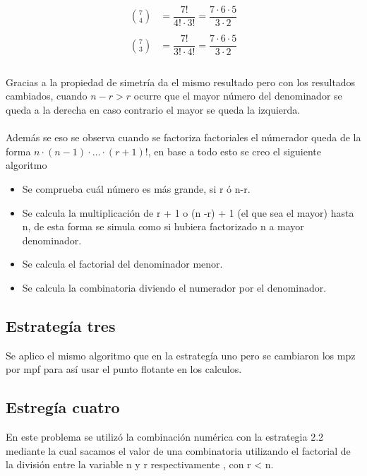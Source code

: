 \documentclass[12pt,letterpaper]{scrartcl}
\begin{document}
\[\begin{matrix}
{7 \choose 4}  &= \dfrac{7!}{4! \cdot 3!} = \dfrac{7 \cdot 6 \cdot 5}{3 \cdot 2}\\ 
 &\\
{7 \choose 3}  &= \dfrac{7!}{3!\cdot4!} = \dfrac{7 \cdot 6 \cdot 5}{3 \cdot 2 }\\
\end{matrix}
\]
\\
Gracias a la propiedad de simetría da el mismo resultado pero con los resultados cambiados, cuando $n-r > r$ ocurre que el mayor número del denominador se queda a la derecha en caso contrario el mayor se queda la izquierda.
\\\\
Además se eso se observa cuando se factoriza factoriales el númerador queda de la forma $n \cdot (n-1) \cdot \ldots \cdot (r+1)!$, en base a todo esto se creo el siguiente algoritmo

\begin{itemize}
\item Se comprueba cuál número es más grande, si r ó n-r.


\item Se calcula la multiplicación de r + 1 o (n -r) + 1 (el que sea el mayor) hasta n, de esta forma se simula como si hubiera factorizado n a mayor denominador.

\item Se calcula el factorial del denominador menor.

\item Se calcula la combinatoria diviendo el numerador por el denominador.

\end{itemize}




\subsection{Estrategía tres}

Se aplico el mismo algoritmo que en la estrategía uno pero se cambiaron los mpz por mpf para así usar el punto flotante en los calculos.


\subsection{Estregía cuatro}


En este problema se utilizó la combinación numérica con la estrategia 2.2 mediante la cual sacamos el valor de una combinatoria utilizando el factorial de la división entre la variable n y r respectivamente , con r < n.
\end{document}
